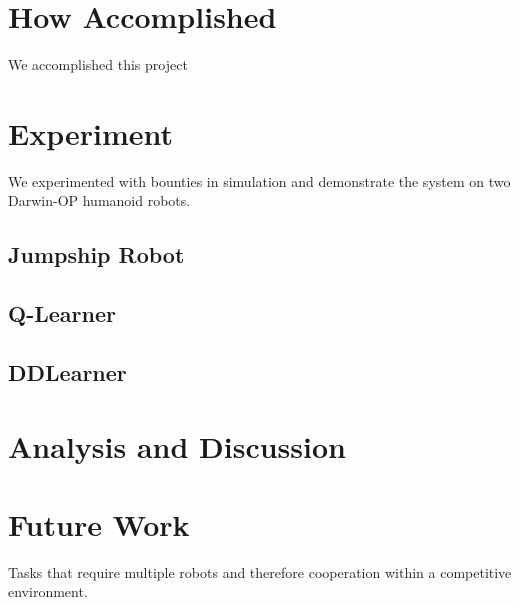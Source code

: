 \documentclass[twocolumn]{article}
\begin{document}
\section{How Accomplished}
We accomplished this project 
\section{Experiment}
We experimented with bounties in simulation and demonstrate the system on two Darwin-OP humanoid robots.
\subsection{Jumpship Robot}
\subsection{Q-Learner}
\subsection{DDLearner}
\section{Analysis and Discussion}

\section{Future Work}
Tasks that require multiple robots and therefore cooperation within a competitive environment.  
\end{document}
